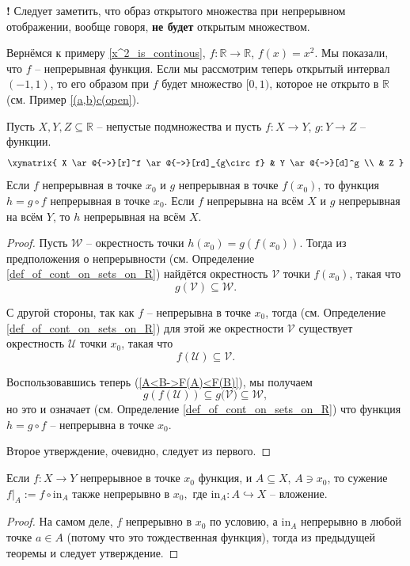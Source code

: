 \begin{mydangerr}{\bf!}
    Следует заметить, что образ открытого множества при непрерывном отображении, вообще говоря, \textbf{не будет} открытым множеством.
\end{mydangerr}


\begin{example}
    Вернёмся к примеру \ref{x^2_is_continous}, $f:\mathbb{R} \to \mathbb{R}$, $f(x) = x^2$. Мы показали, что $f$ -- непрерывная функция. Если мы рассмотрим теперь открытый интервал $(-1,1)$, то его образом при $f$ будет множество $[0,1)$, которое не открыто в $\mathbb{R}$ (см. Пример \ref{(a,b)c(open}).
\end{example}



\begin{theorem}\label{comp_of_continous_on_R}
 Пусть $X,Y,Z \subseteq \mathbb{R}$ -- непустые подмножества  и пусть $f:X \to Y$, $g:Y \to Z$ -- функции.
\[
 \xymatrix{
 X \ar@{->}[r]^f \ar@{->}[rd]_{g\circ f} & Y \ar@{->}[d]^g \\
 & Z 
 }
\]
Если $f$ непрерывная в точке $x_0$ и $g$ непрерывная в точке $f(x_0)$, то функция $h = g \circ f$ непрерывная в точке $x_0.$ Если $f$ непрерывна на всём $X$ и $g$ непрерывная на всём $Y$, то $h$ непрерывная на всём $X.$
\end{theorem}
 \begin{proof}
Пусть $\mathscr{W}$ -- окрестность точки $h(x_0) =  g(f(x_0))$. Тогда из предположения о непрерывности (см. Определение \ref{def_of_cont_on_sets_on_R}) найдётся окрестность $\mathscr{V}$ точки $f(x_0)$, такая что
\[
 g(\mathscr{V}) \subseteq \mathscr{W}.
\]

С другой стороны, так как $f$ -- непрерывна в точке $x_0$, тогда (см. Определение \ref{def_of_cont_on_sets_on_R}) для этой же окрестности $\mathscr{V}$ существует окрестность $\mathscr{U}$ точки $x_0$, такая что
\[
 f(\mathscr{U}) \subseteq \mathscr{V}.
\]

Воспользовавшись теперь (\ref{A<B->F(A)<F(B)}), мы получаем 
\[
 g(f(\mathscr{U})) \subseteq g(\mathscr{V)} \subseteq \mathscr{W},
\]
но это и означает (см. Определение \ref{def_of_cont_on_sets_on_R}) что функция $h = g \circ f$ -- непрерывна в точке $x_0$.

Второе утверждение, очевидно, следует из первого. 
 \end{proof}


\begin{corollary}\label{restriction_on_R}
    Если $f:X \to Y$ непрерывное в точке $x_0$ функция, и $A \subseteq X$, $A \ni x_0$, то сужение $f|_A:=f \circ \mathrm{in}_A$ также непрерывно в $x_0,$ где $\mathrm{in}_A:A \hookrightarrow X$ -- вложение.
\end{corollary}
\begin{proof}
    На самом деле, $f$ непрерывно в $x_0$ по условию, а $\mathrm{in}_A$ непрерывно в любой точке $a \in A$ (потому что это тождественная функция), тогда из предыдущей теоремы и следует утверждение.
\end{proof}




